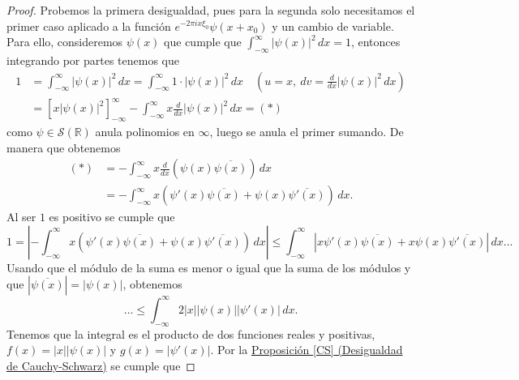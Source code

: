 \documentclass[12pt]{article}
\newcommand{\Sc}{\mathcal{S}(\mathbb{R})}
\theoremstyle{plain}
\theoremstyle{definition}
\numberwithin{equation}{section}
\begin{document}
        \begin{proof}
            Probemos la primera desigualdad, pues para la segunda solo necesitamos el primer caso aplicado a la función \(e^{-2\pi ix\xi_0}\psi(x+x_0)\) y un cambio de variable.
            Para ello, consideremos \(\psi(x)\) que cumple que \(\int_{-\infty}^{\infty} \left\lvert \psi(x) \right\rvert^2 \,dx = 1\), entonces integrando por partes tenemos que
            \begin{align*}
                1 &= \int_{-\infty}^{\infty} \left\lvert \psi(x) \right\rvert^2 \,dx = \int_{-\infty}^{\infty} 1 \cdot \left\lvert \psi(x) \right\rvert^2 \,dx \quad \left( u = x, \ dv = \frac{d}{dx}\left\lvert \psi(x) \right\rvert^2 \,dx \right) \\
                &= \left[ x \left\lvert \psi(x) \right\rvert^2 \right]_{-\infty}^{\infty} - \int_{-\infty}^{\infty} x \frac{d}{dx}\left\lvert \psi(x) \right\rvert^2 \,dx = (\ast)
            \end{align*}
            como \(\psi \in \Sc\) anula polinomios en $\infty$, luego se anula el primer sumando. De manera que obtenemos
                \begin{align*}
                    (\ast) &= - \int_{-\infty}^{\infty} x \frac{d}{dx} \left( \psi(x)\overline{\psi(x)} \right) \,dx\\
                    &= - \int_{-\infty}^{\infty} x \left( \psi'(x)\overline{\psi(x)} + \psi(x)\overline{\psi'(x)} \right) \,dx. 
                \end{align*}            
            Al ser \(1\) es positivo se cumple que
            \begin{equation}
                \label{heisenberg_ineq}
                1 = \left\lvert - \int_{-\infty}^{\infty} x \left( \psi'(x)\overline{\psi(x)} + \psi(x)\overline{\psi'(x)} \right) \,dx \right\rvert \le \int_{-\infty}^{\infty} \left\lvert x \psi'(x)\overline{\psi(x)} + x \psi(x)\overline{\psi'(x)} \right\rvert \,dx\dots
            \end{equation}
            Usando que el módulo de la suma es menor o igual que la suma de los módulos y que \(\left\lvert \overline{\psi(x)} \right\rvert = \left\lvert \psi(x) \right\rvert\), obtenemos
            \begin{equation*}
                \dots \le \int_{-\infty}^{\infty} 2 \left\lvert x \right\rvert \left\lvert \psi(x) \right\rvert \left\lvert \psi'(x) \right\rvert \,dx.
            \end{equation*}
            Tenemos que la integral es el producto de dos funciones reales y positivas, \(f(x) = \left\lvert x \right\rvert \left\lvert \psi(x) \right\rvert\) y \(g(x) = \left\lvert \psi'(x) \right\rvert\). Por la \hyperref[CS]{Proposición \ref*{CS} (Desigualdad de Cauchy-Schwarz)} se cumple que

\end{proof}
\end{document}
